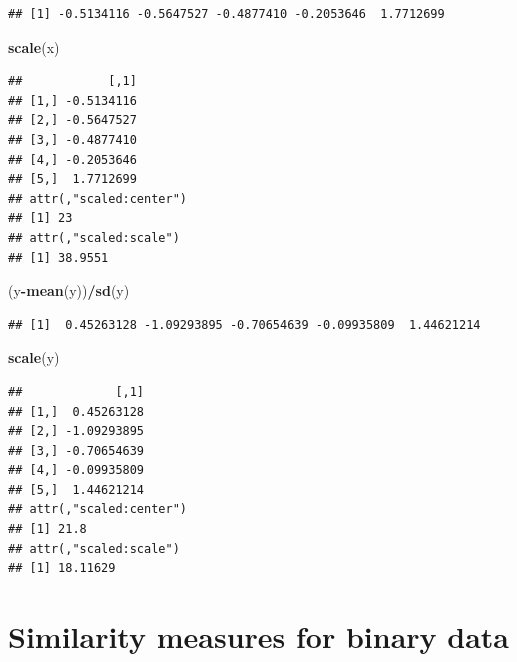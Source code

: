 \documentclass[
]{article}
\newenvironment{Shaded}{\begin{snugshade}}{\end{snugshade}}
\newcommand{\KeywordTok}[1]{\textcolor[rgb]{0.13,0.29,0.53}{\textbf{#1}}}
\newcommand{\NormalTok}[1]{#1}
\newcommand{\OperatorTok}[1]{\textcolor[rgb]{0.81,0.36,0.00}{\textbf{#1}}}
\begin{document}
\begin{verbatim}
## [1] -0.5134116 -0.5647527 -0.4877410 -0.2053646  1.7712699
\end{verbatim}

\begin{Shaded}
\begin{Highlighting}[]
\KeywordTok{scale}\NormalTok{(x)}
\end{Highlighting}
\end{Shaded}

\begin{verbatim}
##            [,1]
## [1,] -0.5134116
## [2,] -0.5647527
## [3,] -0.4877410
## [4,] -0.2053646
## [5,]  1.7712699
## attr(,"scaled:center")
## [1] 23
## attr(,"scaled:scale")
## [1] 38.9551
\end{verbatim}

\begin{Shaded}
\begin{Highlighting}[]
\NormalTok{(y}\OperatorTok{-}\KeywordTok{mean}\NormalTok{(y))}\OperatorTok{/}\KeywordTok{sd}\NormalTok{(y)}
\end{Highlighting}
\end{Shaded}

\begin{verbatim}
## [1]  0.45263128 -1.09293895 -0.70654639 -0.09935809  1.44621214
\end{verbatim}

\begin{Shaded}
\begin{Highlighting}[]
\KeywordTok{scale}\NormalTok{(y)}
\end{Highlighting}
\end{Shaded}

\begin{verbatim}
##             [,1]
## [1,]  0.45263128
## [2,] -1.09293895
## [3,] -0.70654639
## [4,] -0.09935809
## [5,]  1.44621214
## attr(,"scaled:center")
## [1] 21.8
## attr(,"scaled:scale")
## [1] 18.11629
\end{verbatim}

\hypertarget{similarity-measures-for-binary-data}{%
\section{Similarity measures for binary
data}\label{similarity-measures-for-binary-data}}
\end{document}
